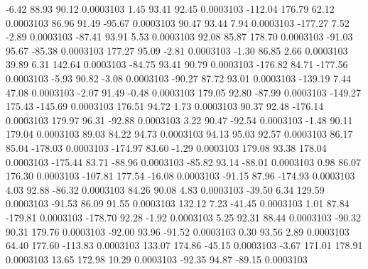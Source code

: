        -6.42       88.93       90.12     0.0003103
        1.45       93.41       92.45     0.0003103
     -112.04      176.79       62.12     0.0003103
       86.96       91.49      -95.67     0.0003103
       90.47       93.44        7.94     0.0003103
     -177.27        7.52       -2.89     0.0003103
      -87.41       93.91        5.53     0.0003103
       92.08       85.87      178.70     0.0003103
      -91.03       95.67      -85.38     0.0003103
      177.27       95.09       -2.81     0.0003103
       -1.30       86.85        2.66     0.0003103
       39.89        6.31      142.64     0.0003103
      -84.75       93.41       90.79     0.0003103
     -176.82       84.71     -177.56     0.0003103
       -5.93       90.82       -3.08     0.0003103
      -90.27       87.72       93.01     0.0003103
     -139.19        7.44       47.08     0.0003103
       -2.07       91.49       -0.48     0.0003103
      179.05       92.80      -87.99     0.0003103
     -149.27      175.43     -145.69     0.0003103
      176.51       94.72        1.73     0.0003103
       90.37       92.48     -176.14     0.0003103
      179.97       96.31      -92.88     0.0003103
        3.22       90.47      -92.54     0.0003103
       -1.48       90.11      179.04     0.0003103
       89.03       84.22       94.73     0.0003103
       94.13       95.03       92.57     0.0003103
       86.17       85.04     -178.03     0.0003103
     -174.97       83.60       -1.29     0.0003103
      179.08       93.38      178.04     0.0003103
     -175.44       83.71      -88.96     0.0003103
      -85.82       93.14      -88.01     0.0003103
        0.98       86.07      176.30     0.0003103
     -107.81      177.54      -16.08     0.0003103
      -91.15       87.96     -174.93     0.0003103
        4.03       92.88      -86.32     0.0003103
       84.26       90.08        4.83     0.0003103
      -39.50        6.34      129.59     0.0003103
      -91.53       86.09       91.55     0.0003103
      132.12        7.23      -41.45     0.0003103
        1.01       87.84     -179.81     0.0003103
     -178.70       92.28       -1.92     0.0003103
        5.25       92.31       88.44     0.0003103
      -90.32       90.31      179.76     0.0003103
      -92.00       93.96      -91.52     0.0003103
        0.30       93.56        2.89     0.0003103
       64.40      177.60     -113.83     0.0003103
      133.07      174.86      -45.15     0.0003103
       -3.67      171.01      178.91     0.0003103
       13.65      172.98       10.29     0.0003103
      -92.35       94.87      -89.15     0.0003103
